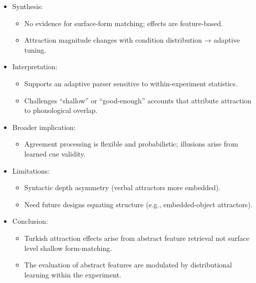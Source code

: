 \documentclass[
  authoryear,
  preprint]{elsarticle}
\providecommand{\tightlist}{%
  \setlength{\itemsep}{0pt}\setlength{\parskip}{0pt}}
\begin{document}
\begin{itemize}
\tightlist
\item
  Synthesis:

  \begin{itemize}
  \tightlist
  \item
    No evidence for surface-form matching; effects are feature-based.
  \item
    Attraction magnitude changes with condition distribution → adaptive
    tuning.
  \end{itemize}
\item
  Interpretation:

  \begin{itemize}
  \tightlist
  \item
    Supports an adaptive parser sensitive to within-experiment
    statistics.
  \item
    Challenges ``shallow'' or ``good-enough'' accounts that attribute
    attraction to phonological overlap.
  \end{itemize}
\item
  Broader implication:

  \begin{itemize}
  \tightlist
  \item
    Agreement processing is flexible and probabilistic; illusions arise
    from learned cue validity.
  \end{itemize}
\item
  Limitations:

  \begin{itemize}
  \tightlist
  \item
    Syntactic depth asymmetry (verbal attractors more embedded).
  \item
    Need future designs equating structure (e.g., embedded-object
    attractors).
  \end{itemize}
\item
  Conclusion:

  \begin{itemize}
  \tightlist
  \item
    Turkish attraction effects arise from abstract feature retrieval not
    surface level shallow form-matching.\\
  \item
    The evaluation of abstract features are modulated by distributional
    learning within the experiment.
  \end{itemize}
\end{itemize}



\end{document}
